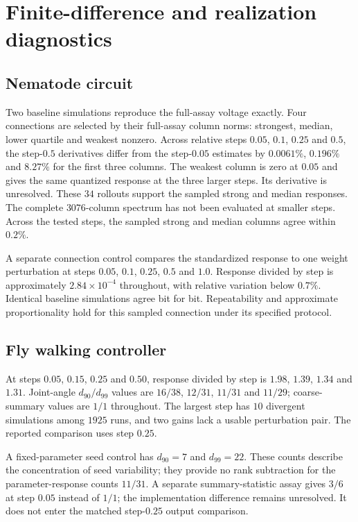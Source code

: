 \documentclass[11pt,letterpaper]{article}
\begin{document}
\section{Finite-difference and realization diagnostics}
\subsection{Nematode circuit}
Two baseline simulations reproduce the full-assay voltage exactly. Four connections are selected by their full-assay column norms: strongest, median, lower quartile and weakest nonzero. Across relative steps $0.05$, $0.1$, $0.25$ and $0.5$, the step-$0.5$ derivatives differ from the step-$0.05$ estimates by $0.0061\%$, $0.196\%$ and $8.27\%$ for the first three columns. The weakest column is zero at $0.05$ and gives the same quantized response at the three larger steps. Its derivative is unresolved. These $34$ rollouts support the sampled strong and median responses. The complete $3076$-column spectrum has not been evaluated at smaller steps. Across the tested steps, the sampled strong and median columns agree within $0.2\%$.

A separate connection control compares the standardized response to one weight perturbation at steps $0.05$, $0.1$, $0.25$, $0.5$ and $1.0$. Response divided by step is approximately $2.84\times10^{-4}$ throughout, with relative variation below $0.7\%$. Identical baseline simulations agree bit for bit. Repeatability and approximate proportionality hold for this sampled connection under its specified protocol.

\subsection{Fly walking controller}
At steps $0.05$, $0.15$, $0.25$ and $0.50$, response divided by step is $1.98$, $1.39$, $1.34$ and $1.31$. Joint-angle $d_{90}/d_{99}$ values are $16/38$, $12/31$, $11/31$ and $11/29$; coarse-summary values are $1/1$ throughout. The largest step has $10$ divergent simulations among $1925$ runs, and two gains lack a usable perturbation pair. The reported comparison uses step $0.25$.

A fixed-parameter seed control has $d_{90}=7$ and $d_{99}=22$. These counts describe the concentration of seed variability; they provide no rank subtraction for the parameter-response counts $11/31$. A separate summary-statistic assay gives $3/6$ at step $0.05$ instead of $1/1$; the implementation difference remains unresolved. It does not enter the matched step-$0.25$ output comparison.
\end{document}
